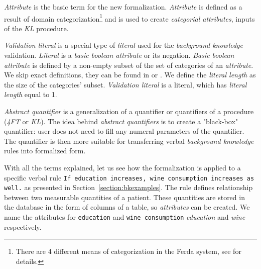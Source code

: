\documentclass{llncs}
\begin{document}
\medskip
\emph{Attribute} is the basic term for the new formalization. \emph{Attribute}
is defined as a result of domain categorization\footnote{There are 4 different means
of categorization in the Ferda system, see \cite{Ferda} for details.} and is used
to create \emph{categorial attributes}, inputs of the \emph{KL} procedure. 

\medskip
\emph{Validation literal} is a special type of \emph{literal} used for the
\emph{background knowledge} validation. \emph{Literal} is a \emph{basic boolean 
attribute} or its negation. \emph{Basic boolean attribute} is defined by a non-empty subset
of the set of categories of an \emph{attribute}. We skip exact definitions, they
can be found in \cite{Kuchar} or \cite{Rauch}. We define the \emph{literal length}
as the size of the categories' subset. \emph{Validation literal} is a literal,
which has \emph{literal length} equal to 1.

\medskip
\emph{Abstract quantifier} is a generalization of a quantifier or quantifiers of 
a procedure (\emph{4FT} or \emph{KL}). The idea behind \emph{abstract quantifiers}
is to create a "black-box" quantifier: user does not need to fill any numeral 
parameters of the quantifier. The quantifier is then more suitable for transferring
verbal \emph{background knowledge} rules into formalized form.

\medskip
With all the terms explained, let us see how the formalization is applied to 
a specific verbal rule \texttt{If education increases, wine consumption increases as well.}
as presented in Section~\ref{section:bkexamples}. The rule defines relationship
between two measurable quantities of a patient. These quantities are stored in the
database in the form of columns of a table, so \emph{attributes} can be created.
We name the attributes for \texttt{education} and \texttt{wine consumption}
\emph{education} and \emph{wine} respectively.
\end{document}
